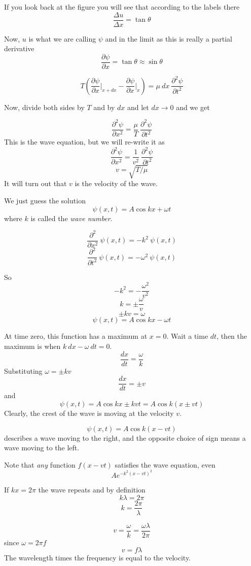 \documentclass[11pt, oneside]{article}   	%
\begin{document}
If you look back at the figure you will see that according to the labels there
\[ \frac{\Delta u}{\Delta x} = \tan \theta \]

Now, $u$ is what we are calling $\psi$ and in the limit as  this is really a partial derivative
\[ \frac{\partial \psi}{\partial x} = \tan \theta \approx \sin \theta \]

\[ T ( \frac{\partial \psi}{\partial x} \bigg |_{x + dx} - \frac{\partial \psi}{\partial x} \bigg |_{x})  =  \mu \ dx \ \frac{\partial^2 \psi}{\partial t^2} \]

Now, divide both sides by $T$ and by $dx$ and let $dx \rightarrow 0$ and we get

\[ \frac{\partial^2 \psi}{\partial x^2} =  \frac{\mu}{T}  \ \frac{\partial^2 \psi}{\partial t^2} \]
This is the wave equation, but we will re-write it as
\[ \frac{\partial^2 \psi}{\partial x^2} =  \frac{1}{v^2}  \ \frac{\partial^2 \psi}{\partial t^2} \]
\[ v = \sqrt{T/\mu} \]
It will turn out that $v$ is the velocity of the wave.

We just guess the solution
\[ \psi(x,t) = A \cos kx + \omega t \]
where $k$ is called the \emph{wave number}.

\[ \frac{\partial^2}{\partial x^2} \ \psi(x,t) = -k^2  \ \psi(x,t) \]
\[ \frac{\partial^2}{\partial t^2} \ \psi(x,t) = -\omega^2  \ \psi(x,t) \]

So 
\[ -k^2 = -\frac{ \omega^2}{v^2} \]
\[ k = \pm \frac{\omega}{v} \]
\[ \pm kv = \omega \]
\[ \psi(x,t) = A \cos kx - \omega t \]

At time zero, this function has a maximum at $x=0$.  Wait a time $dt$, then the maximum is when $k\ dx-\omega\ dt = 0$.
\[ \frac{dx}{dt} = \frac{\omega}{k} \]
Substituting $\omega = \pm kv$
\[ \frac{dx}{dt} = \pm v \]
and
\[ \psi(x,t) = A \cos kx \pm kvt = A \cos k(x \pm vt) \]
Clearly, the crest of the wave is moving at the velocity $v$.

\[ \psi(x,t) = A \cos k(x - vt) \]
describes a wave moving to the right, and the opposite choice of sign means a wave moving to the left.

Note that \emph{any} function $f(x - vt)$ satisfies the wave equation, even
\[ A e^{-k^2(x-vt)^2} \]

If $kx = 2 \pi$ the wave repeats and by definition
\[ k \lambda = 2 \pi \]
\[ k = \frac{2 \pi}{\lambda} \]

\[ v = \frac{\omega}{k} = \frac{\omega \lambda}{2 \pi} \]
since $\omega = 2 \pi f$
\[ v = f \lambda \]
The wavelength times the frequency is equal to the velocity.
\end{document}
